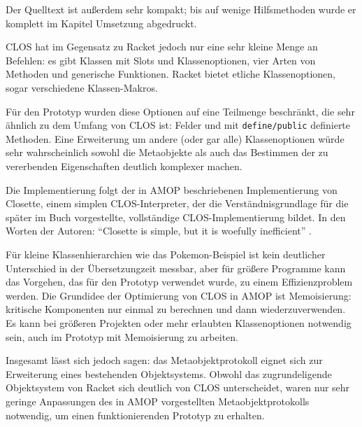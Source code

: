 Der Quelltext ist außerdem sehr kompakt; bis auf wenige Hilfsmethoden wurde er komplett im Kapitel Umsetzung abgedruckt.

CLOS hat im Gegensatz zu Racket jedoch nur eine sehr kleine Menge an Befehlen: es gibt Klassen mit Slots und Klassenoptionen, vier Arten von Methoden und generische Funktionen. Racket bietet etliche Klassenoptionen, sogar verschiedene Klassen-Makros.

Für den Prototyp wurden diese Optionen auf eine Teilmenge beschränkt, die sehr ähnlich zu dem Umfang von CLOS ist: Felder und mit \texttt{define/public} definierte Methoden. Eine Erweiterung um andere (oder gar alle) Klassenoptionen würde sehr wahrscheinlich sowohl die Metaobjekte als auch das Bestimmen der zu vererbenden Eigenschaften deutlich komplexer machen. 

Die Implementierung folgt der in AMOP beschriebenen Implementierung von Closette, einem simplen CLOS-Interpreter, der die Verständnisgrundlage für die später im Buch vorgestellte, vollständige CLOS-Implementierung bildet. In den Worten der Autoren: ``Closette is simple, but it is woefully inefficient'' \cite[S.45]{amop}. 

Für kleine Klassenhierarchien wie das Pokemon-Beispiel ist kein deutlicher Unterschied in der Übersetzungzeit messbar, aber für größere Programme kann das Vorgehen, das für den Prototyp verwendet wurde, zu einem Effizienzproblem werden. Die Grundidee der Optimierung von CLOS in AMOP ist Memoisierung: kritische Komponenten nur einmal zu berechnen und dann wiederzuverwenden. Es kann bei größeren Projekten oder mehr erlaubten Klassenoptionen notwendig sein, auch im Prototyp mit Memoisierung zu arbeiten.

Insgesamt lässt sich jedoch sagen: das Metaobjektprotokoll eignet sich zur Erweiterung eines bestehenden Objektsystems. Obwohl das zugrundeligende Objektsystem von Racket sich deutlich von CLOS unterscheidet, waren nur sehr geringe Anpassungen des in AMOP vorgestellten Metaobjektprotokolls notwendig, um einen funktionierenden Prototyp zu erhalten.
